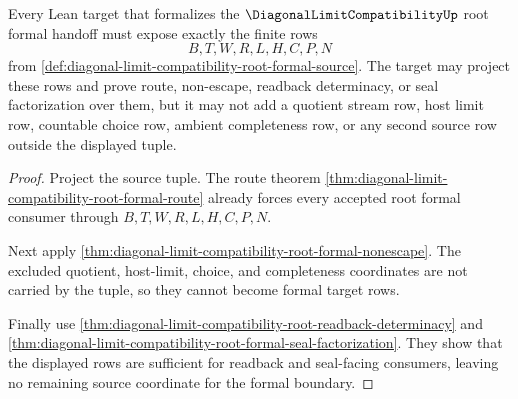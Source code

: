 \begin{theorem}
\label{thm:diagonal-limit-compatibility-root-formal-lean-target-boundary}
Every Lean target that formalizes the $\DiagonalLimitCompatibilityUp$ root formal handoff must expose exactly the finite rows
$$
B,T,W,R,L,H,C,P,N
$$
from \autoref{def:diagonal-limit-compatibility-root-formal-source}. The target may project these rows and prove route, non-escape, readback determinacy, or seal factorization over them, but it may not add a quotient stream row, host limit row, countable choice row, ambient completeness row, or any second source row outside the displayed tuple.
\end{theorem}
\begin{proof}
Project the source tuple. The route theorem \autoref{thm:diagonal-limit-compatibility-root-formal-route} already forces every accepted root formal consumer through $B,T,W,R,L,H,C,P,N$.

Next apply \autoref{thm:diagonal-limit-compatibility-root-formal-nonescape}. The excluded quotient, host-limit, choice, and completeness coordinates are not carried by the tuple, so they cannot become formal target rows.

Finally use \autoref{thm:diagonal-limit-compatibility-root-readback-determinacy} and \autoref{thm:diagonal-limit-compatibility-root-formal-seal-factorization}. They show that the displayed rows are sufficient for readback and seal-facing consumers, leaving no remaining source coordinate for the formal boundary.
\end{proof}

